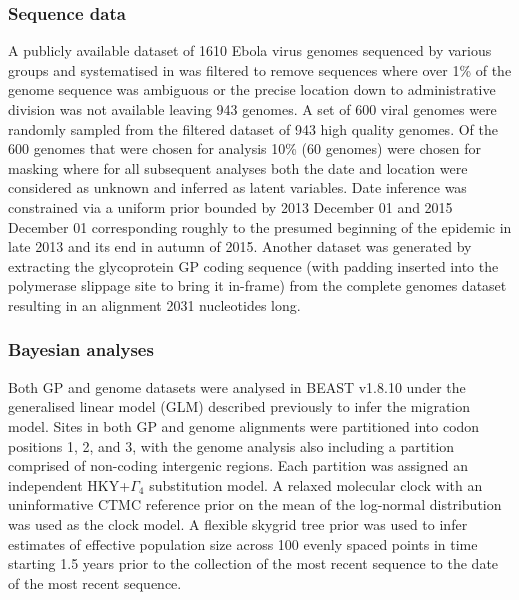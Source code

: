 \documentclass{bmcart}
\begin{document}
\subsubsection*{Sequence data}
A publicly available dataset of 1610 Ebola virus genomes sequenced by various groups \cite{baize_emergence_2014,gire_genomic_2014,park_ebola_2015,carroll_temporal_2015,kugelman_monitoring_2015,ladner_evolution_2015,simon-loriere_distinct_2015,tong_genetic_2015,arias_rapid_2016,smits_genotypic_2015,quick_rapid_2015} and systematised in \cite{dudas_virus_2017} was filtered to remove sequences where over 1\% of the genome sequence was ambiguous or the precise location down to administrative division was not available leaving 943 genomes.
A set of 600 viral genomes were randomly sampled from the filtered dataset of 943 high quality genomes.
Of the 600 genomes that were chosen for analysis 10\% (60 genomes) were chosen for masking where for all subsequent analyses both the date and location were considered as unknown and inferred as latent variables.
Date inference was constrained via a uniform prior bounded by 2013 December 01 and 2015 December 01 corresponding roughly to the presumed beginning of the epidemic in late 2013 and its end in autumn of 2015.
Another dataset was generated by extracting the glycoprotein GP coding sequence (with padding inserted into the polymerase slippage site to bring it in-frame) from the complete genomes dataset resulting in an alignment 2031 nucleotides long.

\subsubsection*{Bayesian analyses}
Both GP and genome datasets were analysed in BEAST v1.8.10 \cite{suchard_bayesian_2018} under the generalised linear model (GLM) described previously \cite{faria_simultaneously_2013,lemey_unifying_2014,dudas_virus_2017} to infer the migration model.
Sites in both GP and genome alignments were partitioned into codon positions 1, 2, and 3, with the genome analysis also including a partition comprised of non-coding intergenic regions.
Each partition was assigned an independent HKY+$\Gamma_{4}$ \cite{hky_1985,yang_1994} substitution model.
A relaxed molecular clock \cite{drummond_2006} with an uninformative CTMC reference prior on the mean \cite{ferreira_bayesian_nodate} of the log-normal distribution was used as the clock model.
A flexible skygrid tree prior \cite{gill_2013} was used to infer estimates of effective population size across 100 evenly spaced points in time starting 1.5 years prior to the collection of the most recent sequence to the date of the most recent sequence.
\end{document}
